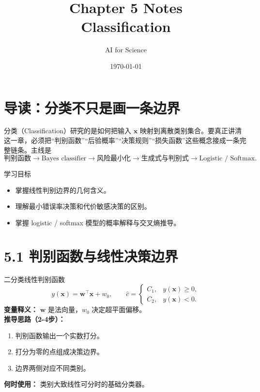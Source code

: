﻿\documentclass[11pt]{article}
\title{Chapter 5 Notes\\\large Classification}
\author{AI for Science}
\date{\today}
\begin{document}
\maketitle
\tableofcontents
\newpage

\section{导读：分类不只是画一条边界}
分类（Classification）研究的是如何把输入 $\mathbf x$ 映射到离散类别集合。要真正讲清这一章，必须把“判别函数”“后验概率”“决策规则”“损失函数”这些概念接成一条完整链条。主线是
\[
\text{判别函数} \rightarrow \text{Bayes classifier} \rightarrow \text{风险最小化} \rightarrow \text{生成式与判别式} \rightarrow \text{Logistic / Softmax}.
\]

\begin{insightbox}{学习目标}
\begin{itemize}[leftmargin=1.6em]
  \item 掌握线性判别边界的几何含义。
  \item 理解最小错误率决策和代价敏感决策的区别。
  \item 掌握 logistic / softmax 模型的概率解释与交叉熵推导。
\end{itemize}
\end{insightbox}

\section{5.1 判别函数与线性决策边界}
\begin{formulabox}{二分类线性判别函数}
\begin{equation}
y(\mathbf x)=\mathbf w^\top \mathbf x+w_0,
\qquad
\hat c=\begin{cases}C_1,&y(\mathbf x)\ge 0,\\ C_2,&y(\mathbf x)<0.
\end{cases}
\end{equation}
\textbf{变量释义：} $\mathbf w$ 是法向量，$w_0$ 决定超平面偏移。\\
\textbf{推导思路（2-4步）：}
\begin{enumerate}[leftmargin=1.6em]
  \item 判别函数输出一个实数打分。
  \item 打分为零的点组成决策边界。
  \item 边界两侧对应不同类别。
\end{enumerate}
\textbf{何时使用：} 类别大致线性可分时的基础分类器。
\end{formulabox}
\end{document}
